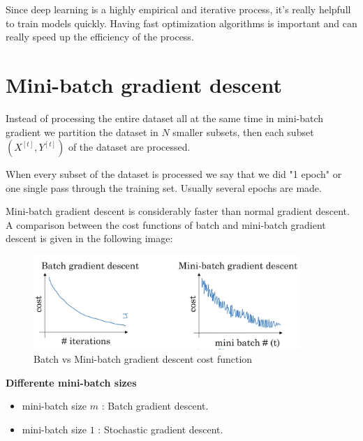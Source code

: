 




Since deep learning is a highly empirical and iterative process, it's really helpfull 
to train models quickly. Having fast optimization algorithms is important and can
really speed up the efficiency of the process.

\section*{Mini-batch gradient descent}

Instead of processing the entire dataset all at the same time in mini-batch gradient we
partition the dataset in $N$ smaller subsets, then each subset $(X^{[t]}, Y^{[t]})$ of 
the dataset are processed.

When every subset of the dataset is processed we say that we did "1 epoch" or one single
pass through the training set. Usually several epochs are made.

Mini-batch gradient descent is considerably faster than normal gradient descent. A 
comparison between the cost functions of batch and mini-batch gradient descent is given 
in the following image:

\begin{figure}[H]
    \begin{center}
            \includegraphics[width=0.9\textwidth]{img/minibatch.png}
            \caption{Batch vs Mini-batch gradient descent cost function}
        \end{center}
\end{figure}

\textbf{Differente mini-batch sizes}
\begin{itemize}
    \item mini-batch size $m$ : Batch gradient descent.
    \item mini-batch size $1$ : Stochastic gradient descent.
\end{itemize}

